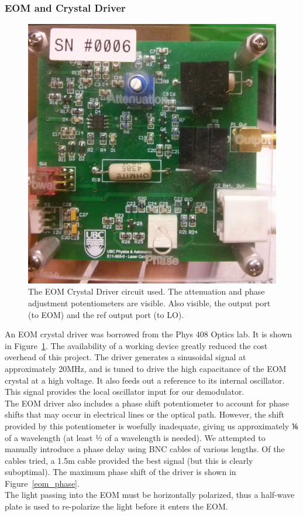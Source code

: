     \subsubsection{EOM and Crystal Driver}
    
\begin{figure}
  \includegraphics[width=.5\textwidth]{figures/eom_driver.jpg}
  \centering\caption{The EOM Crystal Driver circuit used.  The attenuation and phase adjustment potentiometers are visible.  Also visible, the output port (to EOM) and the ref output port (to LO).}
  \label{eom_driver}
\end{figure}

An EOM crystal driver was borrowed from the Phys 408 Optics lab.  It is shown in Figure~\ref{eom_driver}.  The availability of a working device greatly reduced the cost overhead of this project.  The driver generates a sinusoidal signal at approximately 20MHz, and is tuned to drive the high capacitance of the EOM crystal at a high voltage.  It also feeds out a reference to its internal oscillator.  This signal provides the local oscillator input for our demodulator. \\

The EOM driver also includes a phase shift potentiometer to account for phase shifts that may occur in electrical lines or the optical path.  However, the shift provided by this potentiometer is woefully inadequate, giving us approximately ⅙ of a wavelength (at least ½ of a wavelength is needed).  We attempted to manually introduce a phase delay using BNC cables of various lengths.  Of the cables tried, a 1.5m cable provided the best signal (but this is clearly suboptimal).  The maximum phase shift of the driver is shown in Figure~\ref{eom_phase}. \\

The light passing into the EOM must be horizontally polarized, thus a half-wave plate is used to re-polarize the light before it enters the EOM. \\

